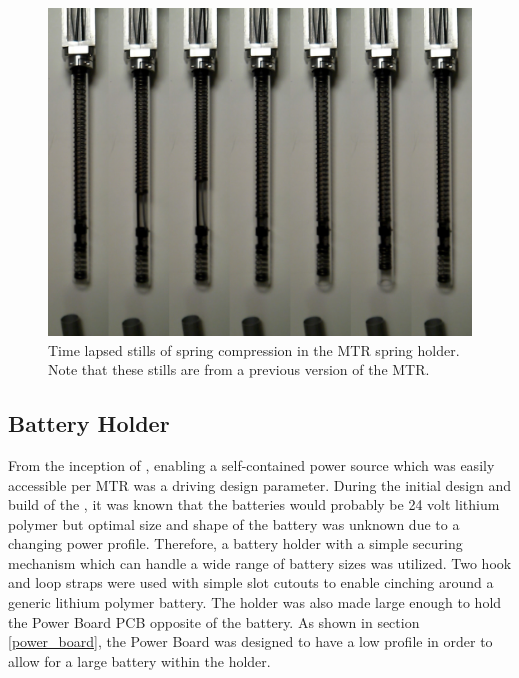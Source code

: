 \begin{figure}[thpb]%
      \centering
      \includegraphics[width=0.8\columnwidth]{tex/img/double_spring_series}
      \caption{Time lapsed stills of spring compression in the MTR spring holder. Note that these stills are from a previous version of the MTR.}
      \label{fig:spring_holder}
\end{figure}

\subsection{Battery Holder}
\label{battery_holder}
From the inception of \SB{}, enabling a self-contained power source which was easily accessible per MTR was a driving design parameter.
During the initial design and build of the \SB{}, it was known that the batteries would probably be 24 volt lithium polymer but optimal size and shape of the battery was unknown due to a changing power profile.
Therefore, a battery holder with a simple securing mechanism which can handle a wide range of battery sizes was utilized.
Two hook and loop straps were used with simple slot cutouts to enable cinching around a generic lithium polymer battery.
The holder was also made large enough to hold the Power Board PCB opposite of the battery.
As shown in section \ref{power_board}, the Power Board was designed to have a low profile in order to allow for a large battery within the holder.

